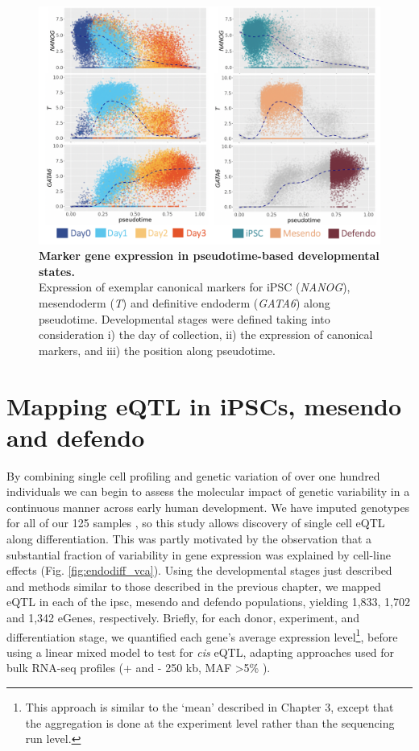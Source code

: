 \begin{figure}[h]
\centering
\includegraphics[width=14cm]{Chapter4/Fig/endodiff_stages.png}
\caption[Developmental stages]{\textbf{Marker gene expression in pseudotime-based developmental states.}\\
Expression of exemplar canonical markers for iPSC (\textit{NANOG}), mesendoderm (\textit{T}) and definitive endoderm (\textit{GATA6}) along pseudotime.
Developmental stages were defined taking into consideration i) the day of collection, ii) the expression of canonical markers, and iii) the position along pseudotime.}
\label{fig:endodiff_stages}
\end{figure}

\section{Mapping eQTL in iPSCs, mesendo and defendo}
\label{sec:endodiff_eqtl}

By combining single cell profiling and genetic variation of over one hundred individuals we can begin to assess the molecular impact of genetic variability in a continuous manner across early human development.
We have imputed genotypes for all of our 125 samples \cite{kilpinen2017common}, so this study allows discovery of single cell eQTL along differentiation. 
This was partly motivated by the observation that a substantial fraction of variability in gene expression was explained by cell-line effects (Fig. \ref{fig:endodiff_vca}).
Using the developmental stages just described and methods similar to those described in the previous chapter, we mapped eQTL in each of the \gls{ipsc}, mesendo and defendo populations, yielding 1,833, 1,702 and 1,342 eGenes, respectively. 
Briefly, for each donor, experiment, and differentiation stage, we quantified each gene’s average expression level\footnote{This approach is similar to the `mean' described in Chapter 
3, except that the aggregation is done at the experiment level rather than the sequencing run level.}, before using a linear mixed model to test for \textit{cis} eQTL, adapting approaches used for bulk RNA-seq profiles (+ and - 250 kb, MAF >5\% \cite{kilpinen2017common}).\\

